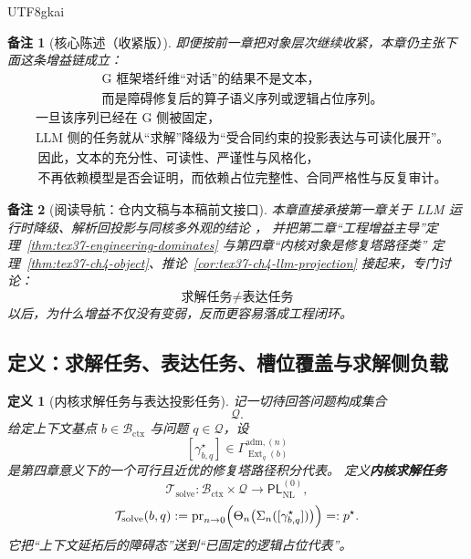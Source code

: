 \documentclass[12pt]{article}
\newtheorem{definition}{定义}[section]
\newtheorem{remark}{备注}[section]
\begin{document}
\begin{CJK*}{UTF8}{gkai}
\begin{remark}[核心陈述（收紧版）]
即便按前一章把对象层次继续收紧，本章仍主张下面这条增益链成立：
\[
  \boxed{
    \begin{aligned}
      &\text{G 框架塔纤维“对话”的结果不是文本，}\\
      &\text{而是障碍修复后的算子语义序列或逻辑占位序列。}
    \end{aligned}
  }
\]
\[
  \boxed{
    \begin{aligned}
      &\text{一旦该序列已经在 G 侧被固定，}\\
      &\text{LLM 侧的任务就从“求解”降级为“受合同约束的投影表达与可读化展开”。}
    \end{aligned}
  }
\]
\[
  \boxed{
    \begin{aligned}
      &\text{因此，文本的充分性、可读性、严谨性与风格化，}\\
      &\text{不再依赖模型是否会证明，而依赖占位完整性、合同严格性与反复审计。}
    \end{aligned}
  }
\]
\end{remark}

\begin{remark}[阅读导航：仓内文稿与本稿前文接口]
本章直接承接第一章关于 LLM 运行时降级、解析回投影与同核多外观的结论
\cite{RepoTex21AuditedWrapper,RepoTex23SemanticBase,RepoTex20SemanticGaugeNormalization}，
并把第二章“工程增益主导”定理~\ref{thm:tex37-engineering-dominates} 与第四章“内核对象是修复塔路径类”
定理~\ref{thm:tex37-ch4-object}、推论~\ref{cor:tex37-ch4-llm-projection} 接起来，专门讨论：
\[
  \text{求解任务} \neq \text{表达任务}
\]
以后，为什么增益不仅没有变弱，反而更容易落成工程闭环。
\end{remark}

\subsection{定义：求解任务、表达任务、槽位覆盖与求解侧负载}
\label{subsec:tex37-ch5-definitions}

\begin{definition}[内核求解任务与表达投影任务]
\label{def:tex37-ch5-task-separation}
记一切待回答问题构成集合
\[
  \mathcal{Q}.
\]
给定上下文基点 $b\in\mathcal{B}_{\mathrm{ctx}}$ 与问题 $q\in\mathcal{Q}$，设
\[
  [\gamma^\star_{b,q}]
  \in
  \Gamma_{\operatorname{Ext}_q(b)}^{\mathrm{adm},(n)}
\]
是第四章意义下的一个可行且近优的修复塔路径积分代表。
定义\textbf{内核求解任务}
\[
  \mathcal{T}_{\mathrm{solve}}:
  \mathcal{B}_{\mathrm{ctx}}\times \mathcal{Q}
  \longrightarrow
  \mathsf{PL}_{\mathrm{NL}}^{(0)},
\]
\[
  \mathcal{T}_{\mathrm{solve}}(b,q)
  :=
  \operatorname{pr}_{n\to 0}
  \Bigl(
    \Theta_n\bigl(\Sigma_n([\gamma^\star_{b,q}])\bigr)
  \Bigr)
  =:p^\star.
\]
它把“上下文延拓后的障碍态”送到“已固定的逻辑占位代表”。


\end{definition}
\end{CJK*}
\end{document}
